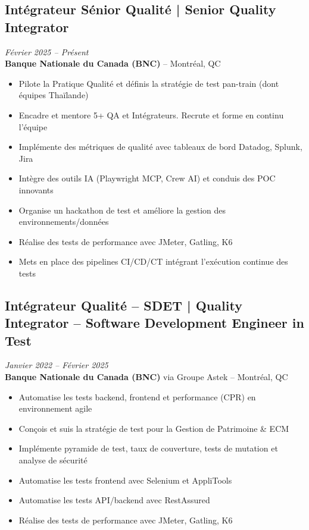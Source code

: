 \documentclass[11pt,a4paper]{article}
\begin{document}
\subsection*{Intégrateur Sénior Qualité | Senior Quality Integrator} \hfill \textit{Février 2025 -- Présent}\\
\textbf{Banque Nationale du Canada (BNC)} -- Montréal, QC
\begin{itemize}
    \item Pilote la Pratique Qualité et définis la stratégie de test pan-train (dont équipes Thaïlande)
    \item Encadre et mentore 5+ QA et Intégrateurs. Recrute et forme en continu l'équipe
    \item Implémente des métriques de qualité avec tableaux de bord Datadog, Splunk, Jira
    \item Intègre des outils IA (Playwright MCP, Crew AI) et conduis des POC innovants
    \item Organise un hackathon de test et améliore la gestion des environnements/données
    \item Réalise des tests de performance avec JMeter, Gatling, K6
    \item Mets en place des pipelines CI/CD/CT intégrant l'exécution continue des tests
\end{itemize}

\subsection*{Intégrateur Qualité -- SDET | Quality Integrator -- Software Development Engineer in Test} \hfill \textit{Janvier 2022 -- Février 2025}\\
\textbf{Banque Nationale du Canada (BNC)} via Groupe Astek -- Montréal, QC
\begin{itemize}
    \item Automatise les tests backend, frontend et performance (CPR) en environnement agile
    \item Conçois et suis la stratégie de test pour la Gestion de Patrimoine \& ECM
    \item Implémente pyramide de test, taux de couverture, tests de mutation et analyse de sécurité
    \item Automatise les tests frontend avec Selenium et AppliTools
    \item Automatise les tests API/backend avec RestAssured
    \item Réalise des tests de performance avec JMeter, Gatling, K6
\end{itemize}
\end{document}
